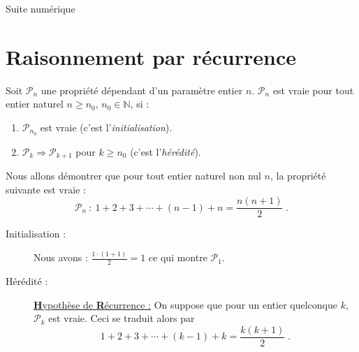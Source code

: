 
\TCDLessonStyleOn
\begin{chapter}{Suite num\'erique}
%
\section{Raisonnement par r\'ecurrence}
%
      \begin{prop}
            Soit $\mathcal{P}_n$ une propri\'et\'e d\'ependant d'un param\`etre entier $n$.
            $\mathcal{P}_n$ est vraie pour tout entier naturel $n \geq n_0$, $n_0 \in \mathbb{N}$, si : 
                  \begin{enumerate}
                        \item $\mathcal{P}_{n_0}$ est vraie (c'est l'\emph{initialisation}).
                        \item $\mathcal{P}_k \Rightarrow \mathcal{P}_{k+1}$ pour $k\geq n_0$ (c'est l'\emph{h\'er\'edit\'e}).
                  \end{enumerate}
      \end{prop}
      \begin{ex}
            Nous allons d\'emontrer que pour tout entier naturel non nul $n$,
            la propri\'et\'e suivante est vraie : 
                  $$
                        \mathcal{P}_n \ : \ 
                        1 + 2 + 3 + \cdots + (n-1) + n = \frac{n (n+1)}{2}
                        \;.
                  $$
            \begin{description}
                  \item[Initialisation :]
                        Nous avons :
                              $
                                    \frac{1 \cdot (1+1)}{2} = 1 
                              $
                        ce qui montre $\mathcal{P}_1$.
                  \item[H\'er\'edit\'e :]
                        \underline{\textbf{H}ypoth\`ese de \textbf{R}\'ecurrence :}
                        On suppose que pour un entier quelconque $k$, $\mathcal{P}_k$ est vraie.
                        Ceci se traduit alors par 
                              \[
                              1+2+3+\cdots+(k-1)+k = \frac{k(k+1)}{2}\;.
\]
\end{description}
\end{ex}
\end{chapter}
